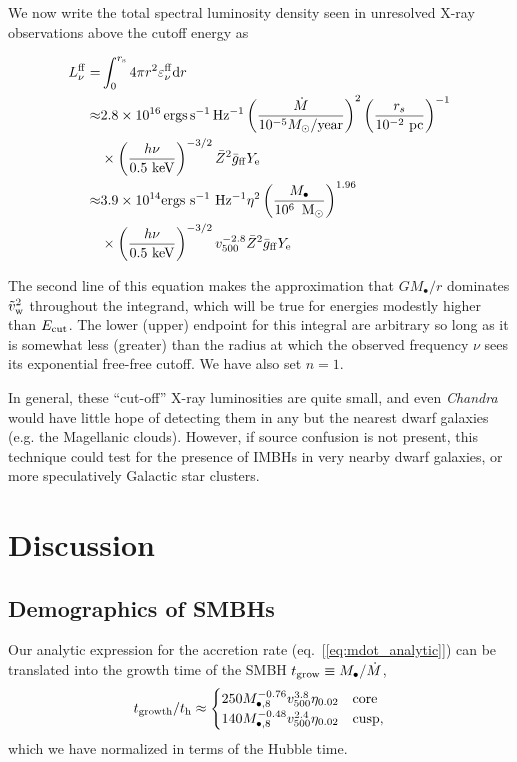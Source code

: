 \documentclass[usenatbib,fleqn]{mn2e}
\newcommand{\rs}{r_s}
\newcommand{\Mbh}[1][]{M_{\bullet#1}}
\newcommand{\Mbheight}{M_{\bullet,8}}
\begin{document}
We now write the total spectral luminosity density seen in unresolved
X-ray observations above the cutoff energy as

\begin{align}
 L_{\nu}^{\rm ff} =& \int_0^{r_{\rm s}} 4\pi r^2 \varepsilon_{\nu}^{\rm ff}{\rm d}r \\
\approx & 2.8\times 10^{16} \, {\rm ergs \, s^{-1}
  \, Hz^{-1}} \left(\frac{\dot{M}}{10^{-5}M_\odot/{\rm
      year}} \right)^2 \left(\frac{\rs}{10^{-2}~{\rm pc}} \right)^{-1}
   \notag \\
& \times \left(\frac{h \nu}{0.5~{\rm keV}}\right)^{-3/2} \bar{Z}^2 \bar{g}_{\rm ff} Y_{\rm e} \notag \\
\approx & 3.9\times 10^{14} {\rm ergs~s^{-1}~Hz^{-1}}
\eta^2 \left(\frac{\Mbh}{10^{6}~{\Msun}} \right)^{1.96} \notag\\&\times
\left(\frac{h \nu}{0.5~{\rm keV}}\right)^{-3/2} v_{500}^{-2.8} \bar{Z}^2 \bar{g}_{\rm ff} Y_{\rm e} 
\end{align}

The second line of this equation makes the approximation that
$GM_\bullet/r$ dominates $\tilde{v}_{\rm w}^2$ throughout the
integrand, which will be true for energies modestly higher than
$E_{\rm cut}$.  The lower (upper) endpoint for this integral are
arbitrary so long as it is somewhat less (greater) than the radius at
which the observed frequency $\nu$ sees its exponential free-free
cutoff. We have also set $n=1$.

In general, these ``cut-off'' X-ray luminosities are quite small, and
even {\it Chandra} would have little hope of detecting them in any but
the nearest dwarf galaxies (e.g. the Magellanic clouds).  However, if
source confusion is not present, this technique could test for the
presence of IMBHs in very nearby dwarf galaxies, or more speculatively
Galactic star clusters.


\section{Discussion}
\label{sec:discussion}

\subsection{Demographics of SMBHs}

Our analytic expression for the accretion rate (eq.~[\ref{eq:mdot_analytic}]) can be translated into the growth time of the SMBH $t_{\rm grow} \equiv M_{\bullet}/\dot{M}$,
\begin{eqnarray}
  t_{\rm growth}/t_{\rm h} \approx 
  \begin{cases}
    250 M_{\bullet,8}^{-0.76}
    v_{500}^{3.8}   \eta_{0.02}  & \text{core} \\
    140 \Mbheight^{-0.48}
    v_{500}^{2.4}   \eta_{0.02}  & \text{cusp}, 
  \end{cases}
  \label{eq:tgrow_analytic}
\end{eqnarray}
which we have normalized in terms of the Hubble time.  
\end{document}
